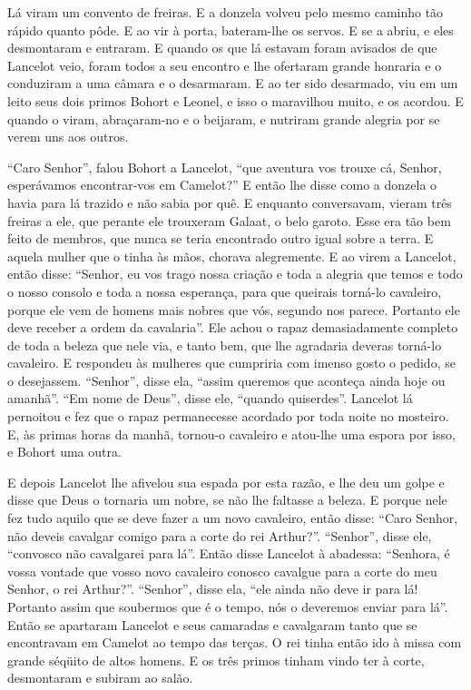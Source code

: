 Lá viram um convento de freiras. E a donzela volveu pelo mesmo caminho tão
rápido quanto pôde. E ao vir à porta, bateram-lhe os servos. E se a abriu, e
eles desmontaram e entraram. E quando os que lá estavam foram avisados de que
Lancelot veio, foram todos a seu encontro e lhe ofertaram grande honraria e o
conduziram a uma câmara e o desarmaram. E ao ter sido desarmado, viu em um
leito seus dois primos Bohort e Leonel, e isso o maravilhou muito, e os
acordou. E quando o viram, abraçaram-no e o beijaram, e nutriram grande alegria
por se verem uns aos outros. 

“Caro Senhor”, falou Bohort a Lancelot, “que aventura vos trouxe cá, Senhor,
esperávamos encontrar-vos em Camelot?” E então lhe disse como a donzela o havia
para lá trazido e não sabia por quê. E enquanto conversavam, vieram três
freiras a ele, que perante ele trouxeram Galaat, o belo garoto. Esse era tão
bem feito de membros, que nunca se teria encontrado outro igual sobre a terra.
E aquela mulher que o tinha às mãos, chorava alegremente. E ao virem a
Lancelot, então disse: “Senhor, eu vos trago nossa criação e toda a alegria
que temos e todo o nosso consolo e toda a nossa esperança, para que queirais
torná-lo cavaleiro, porque ele vem de homens mais nobres que vós, segundo nos
parece. Portanto ele deve receber a ordem da cavalaria”. Ele achou o rapaz
demasiadamente completo de toda a beleza que nele via, e tanto bem, que lhe
agradaria deveras torná-lo cavaleiro. E respondeu às mulheres que cumpriria com
imenso gosto o pedido, se o desejassem. “Senhor”, disse ela, “assim queremos
que aconteça ainda hoje ou amanhã”. “Em nome de Deus”, disse ele, “quando
quiserdes”. Lancelot lá pernoitou e fez que o rapaz permanecesse acordado por
toda noite no mosteiro. E, às primas horas da manhã, tornou-o cavaleiro e
atou-lhe uma espora por isso, e Bohort uma outra.

E depois Lancelot lhe afivelou sua espada por esta razão, e lhe deu um golpe e
disse que Deus o tornaria um nobre, se não lhe faltasse a beleza. E porque nele
fez tudo aquilo que se deve fazer a um novo cavaleiro, então disse: “Caro
Senhor, não deveis cavalgar comigo para a corte do rei Arthur?”.
“Senhor”, disse ele, “convosco não cavalgarei para lá”. Então disse Lancelot à
abadessa: “Senhora, é vossa vontade que vosso novo cavaleiro conosco cavalgue
para a corte do meu Senhor, o rei Arthur?”. “Senhor”, disse ela, “ele ainda não
deve ir para lá! Portanto assim que soubermos que é o tempo, nós o deveremos
enviar para lá”. Então se apartaram Lancelot e seus camaradas e cavalgaram
tanto que se encontravam em Camelot ao tempo das terças. O rei tinha então ido à
missa com grande séqüito de altos homens. E os três primos tinham vindo ter à
corte, desmontaram e subiram ao salão. 

